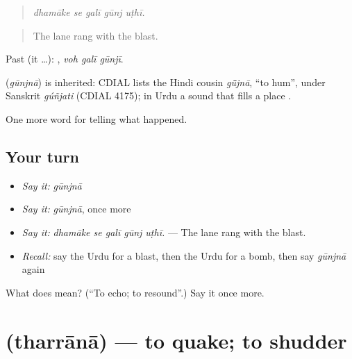 \begin{quote}
    
\end{quote}

\begin{quote}
\emph{dhamāke se galī gūnj uṭhī.}
\end{quote}

\begin{quote}
The lane rang with the blast.
\end{quote}

Past (it …):   , \emph{voh galī gūnjī}.

\begin{cousinweb}
\textbf{} (\emph{gūnjnā}) is inherited: CDIAL lists the Hindi cousin \emph{gū̃jnā}, \textquotedblleft{}to hum\textquotedblright{}, under Sanskrit \emph{gúñjati} (CDIAL 4175); in Urdu a sound that fills a place \textbf{ }.
\end{cousinweb}

\begin{grammarlens}[title={What you've built}]
One more word for telling what happened.
\end{grammarlens}

\subsection*{Your turn}
\begin{itemize}
\raggedright
  \item \emph{Say it:} \emph{gūnjnā}
  \item \emph{Say it:} \emph{gūnjnā}, once more
  \item \emph{Say it:} \emph{dhamāke se galī gūnj uṭhī.} — The lane rang with the blast.
  \item \emph{Recall:} say the Urdu for a blast, then the Urdu for a bomb, then say \emph{gūnjnā} again
\end{itemize}

\begin{tcolorbox}[breakable,colback=teal!4,colframe=teal!35!black,title={Before you move on}]
What does  mean? (\textquotedblleft{}To echo; to resound\textquotedblright{}.) Say it once more.
\end{tcolorbox}
\section[\texorpdfstring{\ur{تھرانا} (tharrānā)}{تھرانا (tharrānā)}]{ (tharrānā) — to quake; to shudder}

